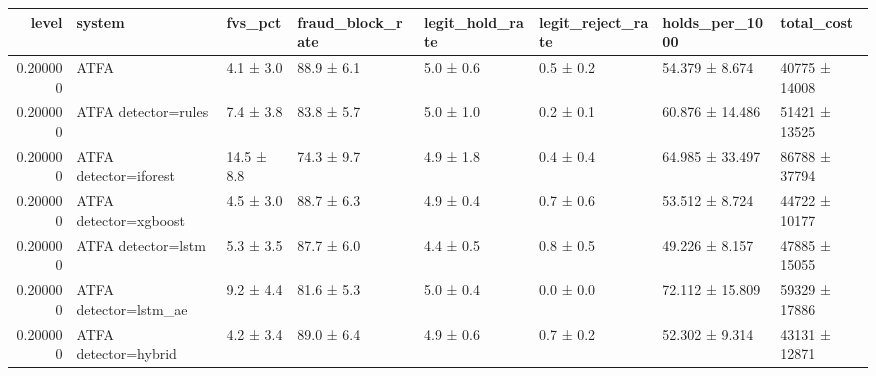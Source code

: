 \begin{tabular}{rlllllll}
\toprule
level & system & fvs\_pct & fraud\_block\_rate & legit\_hold\_rate & legit\_reject\_rate & holds\_per\_1000 & total\_cost \\
\midrule
0.200000 & ATFA & 4.1 ± 3.0 & 88.9 ± 6.1 & 5.0 ± 0.6 & 0.5 ± 0.2 & 54.379 ± 8.674 & 40775 ± 14008 \\
0.200000 & ATFA detector=rules & 7.4 ± 3.8 & 83.8 ± 5.7 & 5.0 ± 1.0 & 0.2 ± 0.1 & 60.876 ± 14.486 & 51421 ± 13525 \\
0.200000 & ATFA detector=iforest & 14.5 ± 8.8 & 74.3 ± 9.7 & 4.9 ± 1.8 & 0.4 ± 0.4 & 64.985 ± 33.497 & 86788 ± 37794 \\
0.200000 & ATFA detector=xgboost & 4.5 ± 3.0 & 88.7 ± 6.3 & 4.9 ± 0.4 & 0.7 ± 0.6 & 53.512 ± 8.724 & 44722 ± 10177 \\
0.200000 & ATFA detector=lstm & 5.3 ± 3.5 & 87.7 ± 6.0 & 4.4 ± 0.5 & 0.8 ± 0.5 & 49.226 ± 8.157 & 47885 ± 15055 \\
0.200000 & ATFA detector=lstm\_ae & 9.2 ± 4.4 & 81.6 ± 5.3 & 5.0 ± 0.4 & 0.0 ± 0.0 & 72.112 ± 15.809 & 59329 ± 17886 \\
0.200000 & ATFA detector=hybrid & 4.2 ± 3.4 & 89.0 ± 6.4 & 4.9 ± 0.6 & 0.7 ± 0.2 & 52.302 ± 9.314 & 43131 ± 12871 \\
\bottomrule
\end{tabular}
